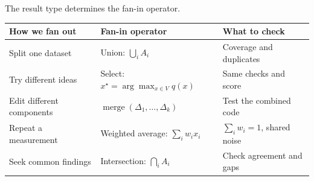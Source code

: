 \begin{frame}[t]{The result type determines the fan-in operator.\ev{\tagP}}
\vspace{0pt}
{\fontsize{11.5}{14}\selectfont
\begin{tabularx}{\linewidth}{@{}L{3.8cm}L{5.0cm}Y@{}}
\toprule\textbf{How we fan out} & \textbf{Fan-in operator} & \textbf{What to check}\\\midrule
Split one dataset & Union: $\bigcup_i A_i$ & Coverage and duplicates\\[5pt]
Try different ideas & Select: $x^\star=\arg\max_{x\in V}q(x)$ & Same checks and score\\[5pt]
Edit different components & $\operatorname{merge}(\Delta_1,\ldots,\Delta_k)$ & Test the combined code\\[5pt]
Repeat a measurement & Weighted average: $\sum_i w_i x_i$ & $\sum_i w_i=1$, shared noise\\[5pt]
Seek common findings & Intersection: $\bigcap_i A_i$ & Check agreement and gaps\\\bottomrule
\end{tabularx}\par}
\vspace{.12cm}

\end{frame}
